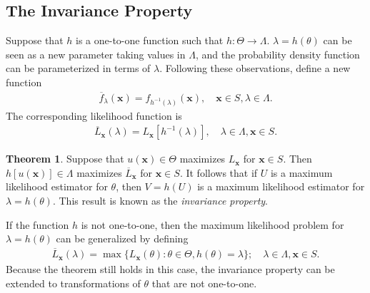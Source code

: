 \documentclass[a4paper,12pt]{article}
\theoremstyle{definition}
\newtheorem{theorem}{Theorem}[section]
\theoremstyle{definition}
\theoremstyle{definition}
\newcommand{\bs}{\boldsymbol}
\begin{document}
    \subsection{The Invariance Property}
    Suppose that $h$ is a one-to-one function such that $h : \Theta \to \Lambda$. $\lambda = h(\theta)$ can be seen as a new parameter taking values in $\Lambda$, and the probability density function can be parameterized in terms of $\lambda$. Following these observations, define a new function
    \begin{align*}
        \overline{f}_\lambda(\bs{x}) = f_{h^{-1}(\lambda)}(\bs{x}), \quad \bs{x} \in S, \lambda \in \Lambda.
    \end{align*}
    The corresponding likelihood function is
    \begin{align*}
        \overline{L}_{\bs{x}}(\lambda) = L_{\bs{x}} \left[ h^{-1}(\lambda) \right], \quad \lambda \in \Lambda, \bs{x} \in S.
    \end{align*}
    \begin{theorem}
        Suppose that $u(\bs{x}) \in \Theta$ maximizes $L_{\bs{x}}$ for $\bs{x} \in S$. Then $h[u(\bs{x})] \in \Lambda$ maximizes $\overline{L}_{\bs{x}}$ for $\bs{x} \in S$. It follows that if $U$ is a maximum likelihood estimator for $\theta$, then $V = h(U)$ is a maximum likelihood estimator for $\lambda = h(\theta)$. This result is known as the \textit{invariance property}.
    \end{theorem}
    If the function $h$ is not one-to-one, then the maximum likelihood problem for $\lambda = h(\theta)$ can be generalized by defining
    \begin{align*}
        \overline{L}_{\bs{x}}(\lambda) = \max\{ L_{\bs{x}}(\theta) : \theta \in \Theta, h(\theta) = \lambda \}; \quad \lambda \in \Lambda, \bs{x} \in S.
    \end{align*}
    Because the theorem still holds in this case, the invariance property can be extended to transformations of $\theta$ that are not one-to-one.
\end{document}

